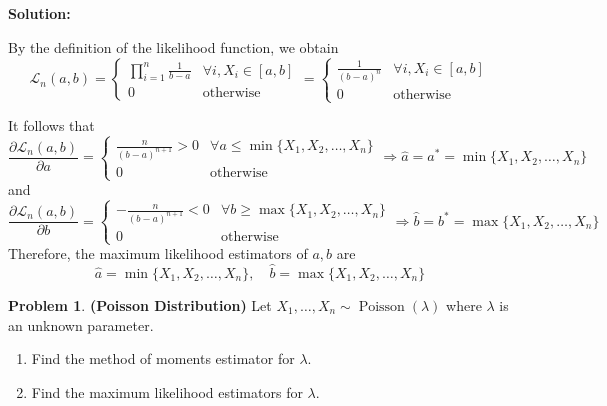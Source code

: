 \documentclass[13pt]{article}
\theoremstyle{definition}
\newtheorem{problem}[theorem]{Problem}
\newenvironment{solution}
{\color{C2}\begin{framed}\begingroup\textbf{Solution:} }
  {\endgroup\end{framed}}
\theoremstyle{remark}
\begin{document}
\begin{solution}
\begin{enumerate}[label=(\alph*),topsep=0pt]
        By the definition of the likelihood function, we obtain
        \[\mathcal{L}_n(a,b) =\begin{cases}\prod_{i=1}^n \frac{1}{b-a} &\forall i, X_i\in [a,b]\\
        0  &\text{otherwise}\end{cases} = \begin{cases} \frac{1}{(b-a)^n} &\forall i, X_i\in [a,b]\\
        0  &\text{otherwise}\end{cases}
        \]
        
        It follows that
        \[
        \frac{\partial \mathcal{L}_n(a,b) }{\partial a} =\begin{cases} \frac{n}{(b-a)^{n+1}}>0 &\forall a \le \min\{X_1, X_2, \ldots ,X_n\}\\
        0 &\text{otherwise}\end{cases}\Longrightarrow \hat{a} = a^* = \min\{X_1, X_2, \ldots ,X_n\}
        \]
        and
        \[
        \frac{\partial \mathcal{L}_n(a,b) }{\partial b} =\begin{cases} -\frac{n}{(b-a)^{n+1}}<0 &\forall b \ge \max\{X_1, X_2, \ldots ,X_n\}\\
        0 &\text{otherwise}\end{cases}\Longrightarrow \hat{b} = b^* = \max\{X_1, X_2, \ldots ,X_n\}
        \]
        Therefore, the maximum likelihood estimators of $a,b$ are
        \[
        \hat{a}  = \min\{X_1, X_2, \ldots ,X_n\}, \quad \hat{b} = \max\{X_1, X_2, \ldots ,X_n\}
        \]
    \end{enumerate}

\end{solution}    

\newpage    
\begin{problem}\textbf{(Poisson Distribution)}
    Let $X_1, \ldots, X_n \sim \operatorname{Poisson}(\lambda)$ where $\lambda$ is an unknown parameter.

    \begin{enumerate}[label=(\alph*),topsep=0pt]
        \item Find the method of moments estimator for $\lambda$.
        \item Find the maximum likelihood estimators for $\lambda$.
    \end{enumerate}
\end{problem}
\end{document}
